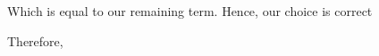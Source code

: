 \documentclass[preview]{standalone}
\begin{document}
\begin{center}
Which is equal to our remaining term. Hence, our choice is correct \par Therefore,
\end{center}
\end{document}
